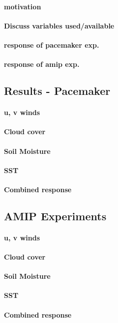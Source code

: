 \paragraph{motivation}
\paragraph{Discuss variables used/available}
\paragraph{response of pacemaker exp.}
\paragraph{response of amip exp.}


\subsection{Results - Pacemaker}
\paragraph{u, v winds}
\paragraph{Cloud cover}
\paragraph{Soil Moisture}
\paragraph{SST}
\paragraph{Combined response}


\subsection{AMIP Experiments}

\paragraph{u, v winds}
\paragraph{Cloud cover}
\paragraph{Soil Moisture}
\paragraph{SST}
\paragraph{Combined response}

